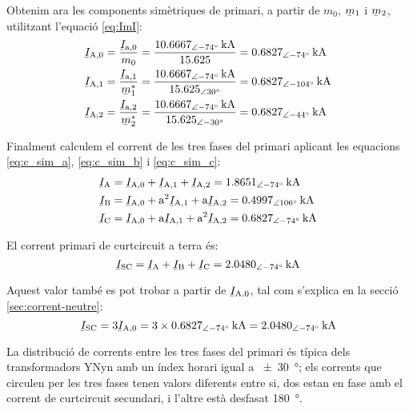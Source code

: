 \begin{exemple}
    Obtenim ara les components simètriques de primari, a partir de $m_0$, $\cmplx{m}_1$ i $\cmplx{m}_2$, utilitzant l'equació \eqref{eq:ImI}:
    \begin{align*}
        \cmplx{I}\ped{A,0} &= \frac{\cmplx{I}\ped{a,0}}{m_0} = \frac{\qtypd{10,6667}{-74}{kA}}{\num{15,625}} =  \qtypd{0,6827}{-74}{kA}\\
        \cmplx{I}\ped{A,1} &= \frac{\cmplx{I}\ped{a,1}}{\cmplx{m}^*_1} = \frac{\qtypd{10,6667}{-74}{kA}}{\numpd{15,625}{30}} =  \qtypd{0,6827}{-104}{kA} \\
        \cmplx{I}\ped{A,2} &= \frac{\cmplx{I}\ped{a,2}}{\cmplx{m}^*_2} = \frac{\qtypd{10,6667}{-74}{kA}}{\numpd{15,625}{-30}} = \qtypd{0,6827}{-44}{kA}
    \end{align*}

    Finalment calculem el corrent de les tres fases del primari aplicant les equacions \eqref{eq:c_sim_a}, \eqref{eq:c_sim_b} i \eqref{eq:c_sim_c}:
     \begin{align*}
        \cmplx{I}\ped{A} &= \cmplx{I}\ped{A,0} + \cmplx{I}\ped{A,1} + \cmplx{I}\ped{A,2} = \qtypd{1,8651}{-74}{kA} \\
        \cmplx{I}\ped{B} &= \cmplx{I}\ped{A,0} + \au^2 \cmplx{I}\ped{A,1} + \au \cmplx{I}\ped{A,2} = \qtypd{0,4997}{106}{kA} \\
        \cmplx{I}\ped{C} &= \cmplx{I}\ped{A,0} + \au \cmplx{I}\ped{A,1} + \au^2 \cmplx{I}\ped{A,2} = \qtypd{0,6827}{-74}{kA}
    \end{align*}

    El corrent primari de curtcircuit a terra és:
    \[
        \cmplx{I}\ped{SC} = \cmplx{I}\ped{A} + \cmplx{I}\ped{B} + \cmplx{I}\ped{C} = \qtypd{2,0480}{-74}{kA}
    \]

    Aquest valor també es pot trobar a partir de $\cmplx{I}\ped{A,0}$, tal com s'explica en la secció \vref{sec:corrent-neutre}:
       \[
        \cmplx{I}\ped{SC} = 3 \cmplx{I}\ped{A,0} = 3 \times \qtypd{0,6827}{-74}{kA} = \qtypd{2,0480}{-74}{kA}
    \]

    La distribució de corrents entre les tres fases del primari és típica dels transformadors YNyn amb un índex horari igual a \qty{+-30}{\degree}; els corrents que circulen per les tres fases tenen valors diferents entre si, dos estan en fase amb el corrent de curtcircuit secundari, i l'altre està desfasat \qty{180}{\degree}.


\end{exemple}

